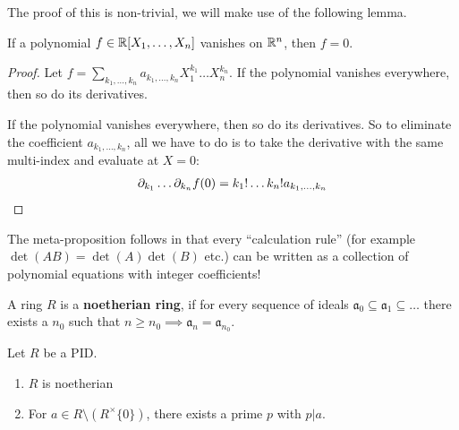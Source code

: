 The proof of this is non-trivial, we will make use of the following lemma.

\begin{lem}[]
  If a polynomial $f \in \mathbb{R}[X_1,\ldots,X_n]$ vanishes on $\mathbb{R}^{n}$, then $f = 0$.

\end{lem}
\begin{proof}
Let $f = \sum_{k_1,\ldots,k_n}a_{k_1,\ldots,k_n}X_1^{k_1}\dots X_n^{k_n}$.
If the polynomial vanishes everywhere, then so do its derivatives.


If the polynomial vanishes everywhere, then so do its derivatives.
So to eliminate the coefficient $a_{k_1,\ldots,k_n}$, all we have to do is to take the derivative with the same multi-index and evaluate at $X = 0$:
\begin{align*}
  \partial_{k_1} \dots \partial_{k_n}f(0) = k_1! \dots k_n! a_{k_1,\ldots,k_n} 
\end{align*}
\end{proof}

The meta-proposition follows in that every ``calculation rule'' (for example $\det(AB) = \det(A) \det(B)$ etc.) can be written as a collection of polynomial equations with integer coefficients!


\begin{dfn}[]
A ring $R$ is a \textbf{noetherian ring}, if for every sequence of ideals $\mathfrak{a}_0 \subseteq \mathfrak{a}_1 \subseteq \ldots$ there exists a $n_0$ such that $n \geq n_0 \implies \mathfrak{a}_n = \mathfrak{a}_{n_0}$.
\end{dfn}

\begin{thm}[]
Let $R$ be a PID. 
\begin{enumerate}
  \item $R$ is noetherian
  \item For $a \in R \setminus (R^{\times} \{0\})$, there exists a prime $p$ with $p | a$.
\end{enumerate}
\end{thm}


